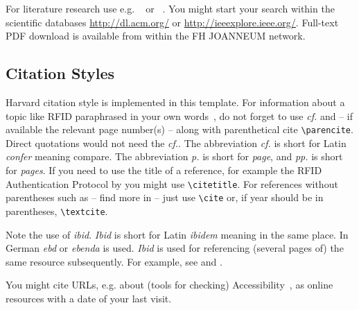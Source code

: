 For literature research use e.g.
~\parencite{acm:diglibrary} or
~\parencite{ieee:xplore}.
You might start your search within the scientific databases
\url{http://dl.acm.org/} or \url{http://ieeexplore.ieee.org/}.
Full-text PDF download is available from within the FH JOANNEUM network.


\subsection{Citation Styles}

Harvard citation style is implemented in this template. For information about
a topic like RFID paraphrased in your own
words~\parencite[cf.][p. 317]{Batina:2011}, \parencites{Chen:2021, Chen:2023} do not forget to use \emph{cf.}
and -- if available the relevant page number(s) -- along with parenthetical
cite \verb+\parencite+. Direct quotations would not need the \emph{cf.}.
The abbreviation \emph{cf.} is short for Latin \emph{confer} meaning compare.
The abbreviation \emph{p.} is short for \emph{page}, and \emph{pp.} is short for \emph{pages}.
If you need to use the title of a reference, for example the RFID Authentication
Protocol by  you might use \verb+\citetitle+.
For references without parentheses such as -- find more in \cite{Li:2008}
-- just use \verb+\cite+ or, if year should be in parentheses,
\textcite{Batina:2011} \verb+\textcite+.

\begin{spar}
  Note the use of \emph{ibid}. \emph{Ibid} is short for Latin \emph{ibidem}
  meaning in the same place. In German \emph{ebd} or \emph{ebenda} is used.
  \emph{Ibid} is used for referencing (several pages of) the same resource
  subsequently. For example,
  see \citep[cf.][p. 317]{Batina:2011} and \citep[cf.][pp. 321-–323]{Batina:2011}
  \citep[cf.][p. 399]{Batina:2011}.
\end{spar}

You might cite URLs, e.g. about (tools for checking)
Accessibility~\parencite[cf.][]{Google:2017a,Google:2016a}, as online
resources with a date of your last visit.




